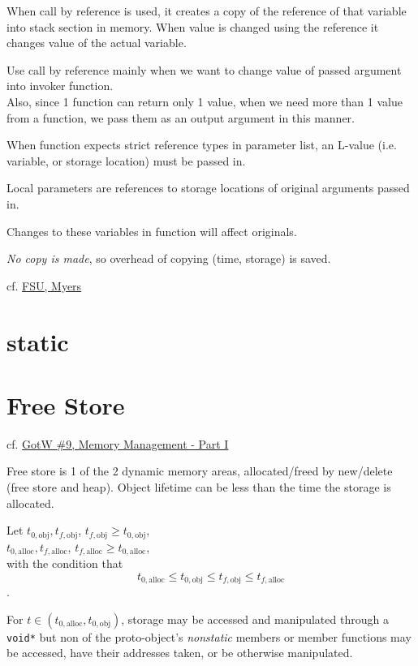 \documentclass[10pt]{amsart}
\begin{document}
\begin{multicols*}{2}
When call by reference is used, it creates a copy of the reference of that variable into stack section in memory. When value is changed using the reference it changes value of the actual variable.

Use call by reference mainly when we want to change value of passed argument into invoker function.\\
Also, since 1 function can return only 1 value, when we need more than 1 value from a function, we pass them as an output argument in this manner.

When function expects strict reference types in parameter list, an L-value (i.e. variable, or storage location) must be passed in.

Local parameters are references to storage locations of original arguments passed in.

Changes to these variables in function will affect originals.

\emph{No copy is made}, so overhead of copying (time, storage) is saved.

cf. \href{https://www.cs.fsu.edu/~myers/c++/notes/references.html}{FSU, Myers}


\section{static}



\section{Free Store}  


cf. \href{http://www.gotw.ca/gotw/009.htm}{GotW \#9, Memory Management - Part I}

Free store is 1 of the 2 dynamic memory areas, allocated/freed by new/delete (free store and heap).  Object lifetime can be less than the time the storage is allocated.  

Let $t_{0,\text{obj}}, t_{f,\text{obj}}$, $t_{f,\text{obj}} \geq t_{0,\text{obj}}$, \\
\phantom{Let } $t_{0,\text{alloc}}, t_{f,\text{alloc}}$, $t_{f,\text{alloc}} \geq t_{0,\text{alloc}}$, \\  
with the condition that 
\[
t_{0,\text{alloc}} \leq t_{0,\text{obj}} \leq t_{f,\text{obj}} \leq t_{f,\text{alloc}}
\].  

For $t \in (t_{0,\text{alloc}} , t_{0,\text{obj}} )$, storage may be accessed and manipulated through a \verb|void*| but non of the proto-object's \emph{nonstatic} members or member functions may be accessed, have their addresses taken, or be otherwise manipulated.  





\end{multicols*}
\end{document}
